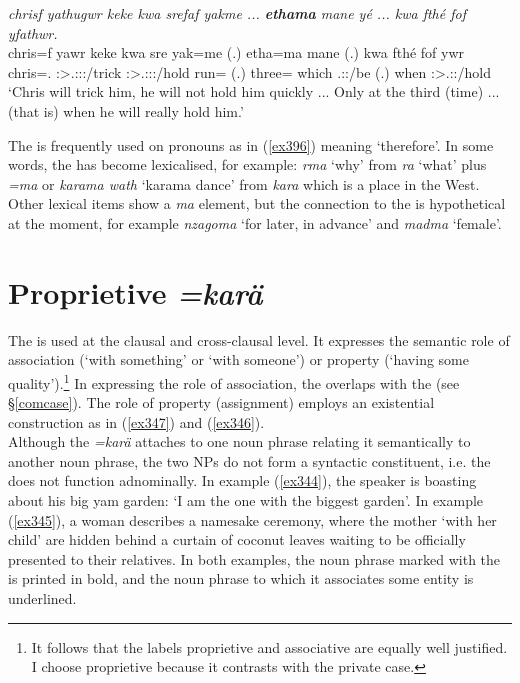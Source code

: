 \begin{exe}
	\ex \emph{chrisf yathugwr keke kwa srefaf yakme ... \textbf{ethama} mane yé ... kwa fthé fof yfathwr.}\\
	\gll chris=f yawr keke kwa sre yak=me (.) etha=ma mane  (.) kwa fthé fof ywr\\
	chris=\Erg.\Sg{} \Stsg:\Sbj>\Tsg.\Masc:\Obj:\Nonpast:\Ipfv/trick \Neg{} \Fut{} \Stsg:\Sbj>\Tsg.\Masc:\Obj:\Irr:\Pfv/hold run=\Ins{} (.) three=\Char{} which \Tsg.\Masc:\Nonpast:\Ipfv/be (.) \Fut{} when \Emph{} \Stsg:\Sbj>\Tsg.\Masc:\Nonpast:\Ipfv/hold\\
	\trans `Chris will trick him, he will not hold him quickly ... Only at the third (time) ... (that is) when he will really hold him.'
	\label{ex402}
\end{exe}

The   is frequently used on  pronouns as in (\ref{ex396}) meaning `therefore'. In some words, the   has become lexicalised, for example: \emph{rma} `why' from \emph{ra} `what' plus \emph{=ma} or \emph{karama wath} `karama dance' from \emph{kara} which is a place in the West. Other lexical items show a \emph{ma} element, but the connection to the   is hypothetical at the moment, for example \emph{nzagoma} `for later, in advance' and \emph{madma} `female'.

\section{Proprietive \emph{=karä}} \label{propcase}

The  is used at the clausal and cross-clausal level. It expresses the semantic role of association (`with something' or `with someone') or property (`having some quality').\footnote{It follows that the labels proprietive and associative are equally well justified. I choose proprietive because it contrasts with the private case.} In expressing the role of association, the  overlaps with the   (see \S{}\ref{comcase}). The role of property (assignment) employs an existential construction as in (\ref{ex347}) and (\ref{ex346}).\\ 

Although the  \emph{=karä} attaches to one noun phrase relating it semantically to another noun phrase, the two NPs do not form a syntactic constituent, i.e. the  does not function adnominally. In example (\ref{ex344}), the speaker is boasting about his big yam garden: `I am the one with the biggest garden'. In example (\ref{ex345}), a woman describes a namesake ceremony, where the mother `with her child' are hidden behind a curtain of coconut leaves waiting to be officially presented to their relatives. In both examples, the noun phrase marked with the  is printed in bold, and the noun phrase to which it associates some entity is underlined.

